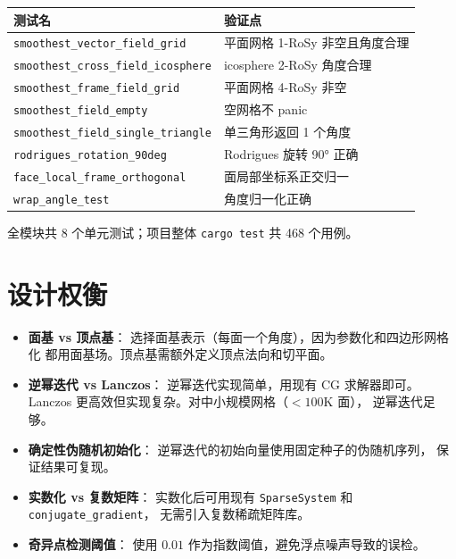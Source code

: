 \documentclass[11pt,a4paper]{article}
\begin{document}
\begin{center}
\renewcommand{\arraystretch}{1.18}
\begin{tabular}{@{}ll@{}}
  \toprule
  \textbf{测试名} & \textbf{验证点} \\
  \midrule
  \texttt{smoothest\_vector\_field\_grid} & 平面网格 1-RoSy 非空且角度合理 \\
  \texttt{smoothest\_cross\_field\_icosphere} & icosphere 2-RoSy 角度合理 \\
  \texttt{smoothest\_frame\_field\_grid} & 平面网格 4-RoSy 非空 \\
  \texttt{smoothest\_field\_empty} & 空网格不 panic \\
  \texttt{smoothest\_field\_single\_triangle} & 单三角形返回 1 个角度 \\
  \texttt{rodrigues\_rotation\_90deg} & Rodrigues 旋转 90° 正确 \\
  \texttt{face\_local\_frame\_orthogonal} & 面局部坐标系正交归一 \\
  \texttt{wrap\_angle\_test} & 角度归一化正确 \\
  \bottomrule
\end{tabular}
\end{center}

全模块共 8 个单元测试；项目整体 \texttt{cargo test} 共 468 个用例。

\section{设计权衡}

\begin{itemize}
  \item \textbf{面基 vs 顶点基}：
        选择面基表示（每面一个角度），因为参数化和四边形网格化
        都用面基场。顶点基需额外定义顶点法向和切平面。

  \item \textbf{逆幂迭代 vs Lanczos}：
        逆幂迭代实现简单，用现有 CG 求解器即可。
        Lanczos 更高效但实现复杂。对中小规模网格（$< 100$K 面），
        逆幂迭代足够。

  \item \textbf{确定性伪随机初始化}：
        逆幂迭代的初始向量使用固定种子的伪随机序列，
        保证结果可复现。

  \item \textbf{实数化 vs 复数矩阵}：
        实数化后可用现有 \texttt{SparseSystem} 和 \texttt{conjugate\_gradient}，
        无需引入复数稀疏矩阵库。

  \item \textbf{奇异点检测阈值}：
        使用 $0.01$ 作为指数阈值，避免浮点噪声导致的误检。
\end{itemize}
\end{document}
